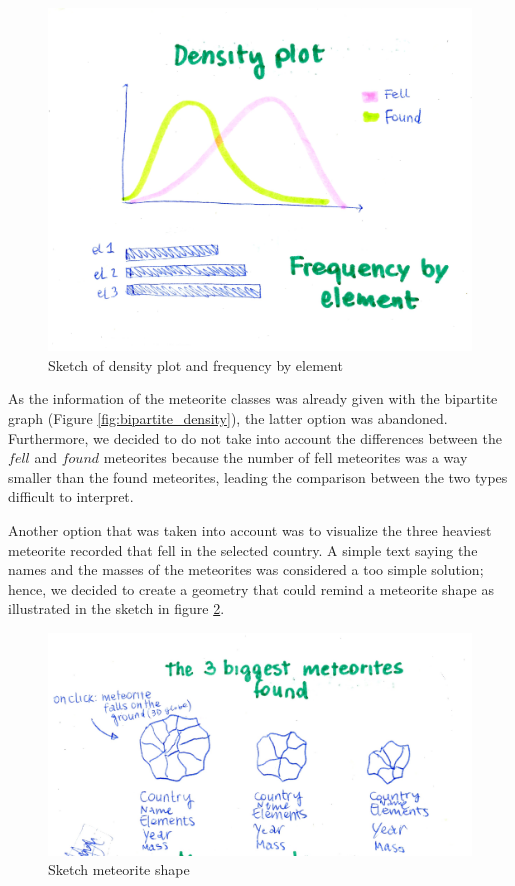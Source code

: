\documentclass[10pt,conference,compsocconf]{IEEEtran}
\begin{document}
\begin{figure}[]
  \centering
  \includegraphics[width=\columnwidth]{images/densityplot}
  \vspace{-3mm}
  \caption{Sketch of density plot and frequency by element}
  \label{fig:density_plot}
\end{figure}


As the information of the meteorite classes was already given with the bipartite graph (Figure \ref{fig:bipartite_density}), the latter option was abandoned. Furthermore, we decided to do not take into account the differences between the $fell$ and $found$ meteorites because the number of fell meteorites was a way smaller than the found meteorites, leading the comparison between the two types difficult to interpret.   

Another option that was taken into account was to visualize the three heaviest meteorite recorded that fell in the selected country. A simple text saying the names and the masses of the meteorites was considered a too simple solution; hence, we decided to create a geometry that could remind a meteorite shape as illustrated in the sketch in figure \ref{fig:sketch_3_biggest}.

\begin{figure}[]
  \centering
  \includegraphics[width=\columnwidth]{images/3biggestmeteorites}
  \caption{Sketch meteorite shape}
  \label{fig:sketch_3_biggest}
\end{figure}
\end{document}
